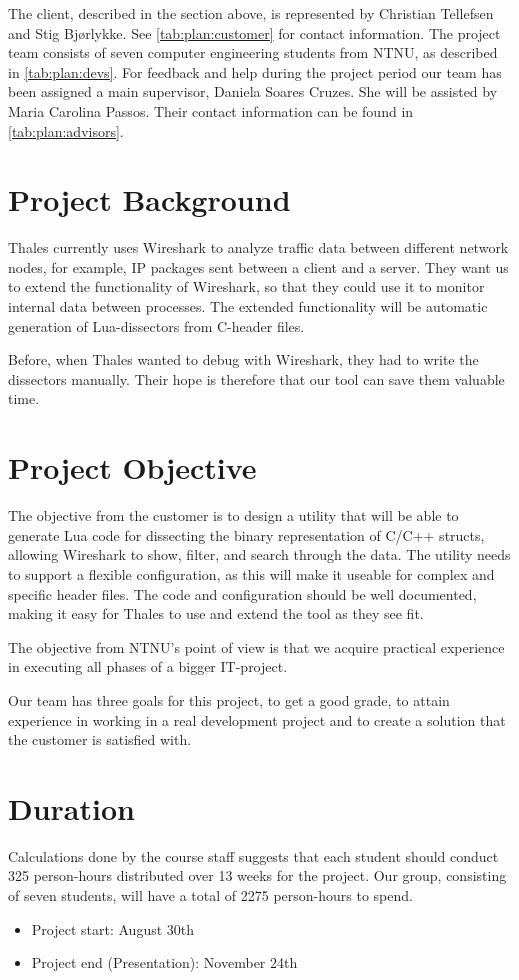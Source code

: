 The client, described in the section above, is represented by Christian Tellefsen and Stig Bjørlykke. See \autoref{tab:plan:customer} for contact information.
The project team consists of seven computer engineering students from NTNU, as described in \autoref{tab:plan:devs}.
For feedback and help during the project period our team has been assigned a main supervisor, Daniela Soares Cruzes.
She will be assisted by Maria Carolina Passos. Their contact information can be found in \autoref{tab:plan:advisors}.

\section{Project Background}
Thales currently uses Wireshark to analyze traffic data between different network nodes, for example, IP packages sent between a client and a server.
They want us to extend the functionality of Wireshark, so that they could use it to monitor internal data between processes. The extended functionality will be automatic generation of Lua-dissectors from C-header files.

Before, when Thales wanted to debug with Wireshark, they had to write the dissectors manually. Their hope is therefore that our tool can save them valuable time.

\section{Project Objective}
The objective from the customer is to design a utility that will be able to generate Lua code for dissecting the binary representation of C/C++ structs, allowing Wireshark to show, filter, and search through the data. The utility needs to support a flexible configuration, as this will make it useable for complex and specific header files. 
The code and configuration should be well documented, making it easy for Thales to use and extend the tool as they see fit.

The objective from NTNU's point of view is that we acquire practical experience in executing all phases of a bigger IT-project.

Our team has three goals for this project, to get a good grade, to attain experience in working in a real development project and to create a solution that the customer
is satisfied with.

\section{Duration}
Calculations done by the course staff suggests that each student should conduct 325 person-hours distributed over 13 weeks for the project. Our group, consisting of seven students, will have a total of 2275 person-hours to spend.\\
\begin {itemize}
	\item Project start: August 30th
	\item Project end (Presentation): November 24th
\end{itemize}

